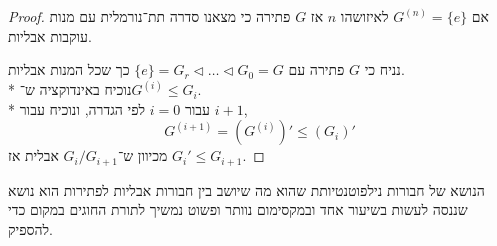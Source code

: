 \begin{proof}
	אם $G^{(n)} = \{e\}$ לאיזושהו $n$ אז $G$ פתירה כי מצאנו סדרה תת־נורמלית עם מנות עוקבות אבליות.

	נניח כי $G$ פתירה עם $\{e\} = G_r \triangleleft \dots \triangleleft G_0 = G$ כך שכל המנות אבליות. \\*
	נוכיח באינדוקציה ש־$G^{(i)} \le G_i$. \\*
	עבור $i = 0$ לפי הגדרה, ונוכיח עבור $i + 1$,
	\[
		G^{(i + 1)} = (G^{(i)})' \le (G_i)'
	\]
	מכיוון ש־$G_i / G_{i + 1}$ אבלית אז $G_i' \le G_{i + 1}$.
\end{proof}
הנושא של חבורות נילפוטנטיותת שהוא מה שיושב בין חבורות אבליות לפתירות הוא נושא שננסה לעשות בשיעור אחד ובמקסימום נוותר ופשוט נמשיך לתורת החוגים במקום כדי להספיק.


